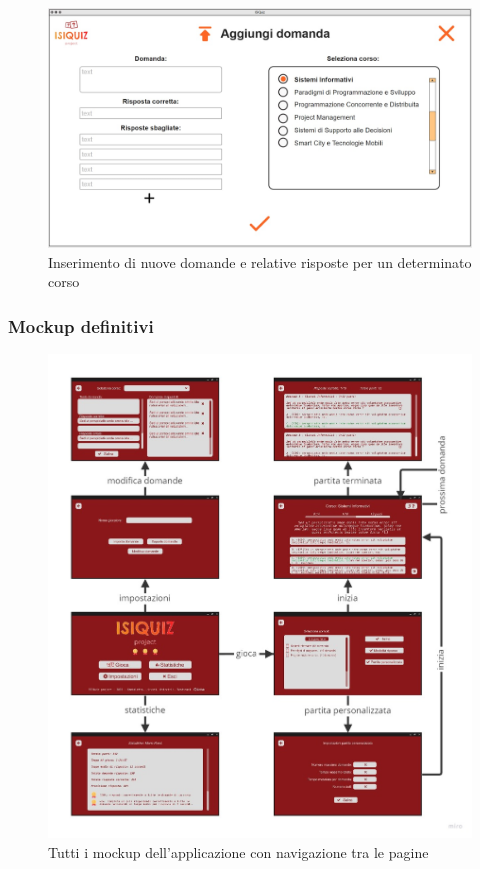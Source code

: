         \begin{figure}[H]
            \centering
            \includegraphics[width=\textwidth]{Images/mockup/import2.jpg}
            \caption{Inserimento di nuove domande e relative risposte per un determinato corso}
            \label{fig:Import2}
        \end{figure}
        
        \subsubsection{Mockup definitivi}\label{mockupFinished}

        \begin{figure}[H]
            \centering
            \includegraphics[width=\textwidth]{Miro/mockup_navigation.jpg}
            \caption{Tutti i mockup dell'applicazione con navigazione tra le pagine}
            \label{fig:mockup_nav}
        \end{figure}
	    
